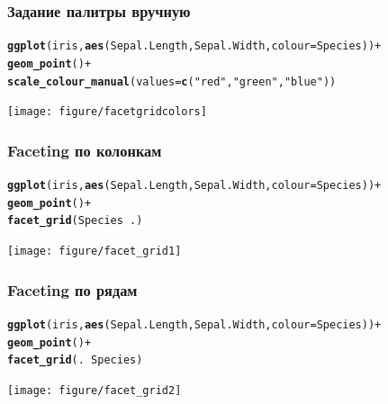 \documentclass[compress]{beamer}\usepackage[]{graphicx}\usepackage[]{color}
\makeatletter
\newcommand{\hlstr}[1]{\textcolor[rgb]{0.192,0.494,0.8}{#1}}%
\newcommand{\hlopt}[1]{\textcolor[rgb]{0,0,0}{#1}}%
\newcommand{\hlstd}[1]{\textcolor[rgb]{0.345,0.345,0.345}{#1}}%
\newcommand{\hlkwc}[1]{\textcolor[rgb]{0.333,0.667,0.333}{#1}}%
\newcommand{\hlkwd}[1]{\textcolor[rgb]{0.737,0.353,0.396}{\textbf{#1}}}%
\newenvironment{kframe}{%
 \def\at@end@of@kframe{}%
 \ifinner\ifhmode%
  \def\at@end@of@kframe{\end{minipage}}%
  \begin{minipage}{\columnwidth}%
 \fi\fi%
 \def\FrameCommand##1{\hskip\@totalleftmargin \hskip-\fboxsep
 \colorbox{shadecolor}{##1}\hskip-\fboxsep
     \hskip-\linewidth \hskip-\@totalleftmargin \hskip\columnwidth}%
 \MakeFramed {\advance\hsize-\width
   \@totalleftmargin\z@ \linewidth\hsize
   \@setminipage}}%
 {\par\unskip\endMakeFramed%
 \at@end@of@kframe}
\newenvironment{knitrout}{}{} %
\makeatother
\begin{document}
\begin{frame}[fragile]
\frametitle{Задание палитры вручную}
\begin{knitrout}\footnotesize
{}\color{fgcolor}\begin{kframe}
\begin{alltt}
\hlkwd{ggplot}\hlstd{(iris,} \hlkwd{aes}\hlstd{(Sepal.Length, Sepal.Width,} \hlkwc{colour} \hlstd{= Species))} \hlopt{+}
  \hlkwd{geom_point}\hlstd{()} \hlopt{+}
  \hlkwd{scale_colour_manual}\hlstd{(}\hlkwc{values} \hlstd{=} \hlkwd{c}\hlstd{(}\hlstr{"red"}\hlstd{,} \hlstr{"green"}\hlstd{,} \hlstr{"blue"}\hlstd{))}
\end{alltt}
\end{kframe}
\texttt{[image: figure/facetgridcolors]} 

\end{knitrout}

\end{frame}

\begin{frame}[fragile]
\frametitle{Faceting по колонкам}
\begin{knitrout}\footnotesize
{}\color{fgcolor}\begin{kframe}
\begin{alltt}
\hlkwd{ggplot}\hlstd{(iris,} \hlkwd{aes}\hlstd{(Sepal.Length, Sepal.Width,} \hlkwc{colour} \hlstd{= Species))} \hlopt{+}
  \hlkwd{geom_point}\hlstd{()} \hlopt{+}
  \hlkwd{facet_grid}\hlstd{(Species} \hlopt{~} \hlstd{.)}
\end{alltt}
\end{kframe}
\texttt{[image: figure/facet\_grid1]} 

\end{knitrout}

\end{frame}

\begin{frame}[fragile]
\frametitle{Faceting по рядам}
\begin{knitrout}\footnotesize
{}\color{fgcolor}\begin{kframe}
\begin{alltt}
\hlkwd{ggplot}\hlstd{(iris,} \hlkwd{aes}\hlstd{(Sepal.Length, Sepal.Width,} \hlkwc{colour} \hlstd{= Species))} \hlopt{+}
  \hlkwd{geom_point}\hlstd{()} \hlopt{+}
  \hlkwd{facet_grid}\hlstd{(.} \hlopt{~} \hlstd{Species)}
\end{alltt}
\end{kframe}
\texttt{[image: figure/facet\_grid2]} 

\end{knitrout}

\end{frame}
\end{document}
